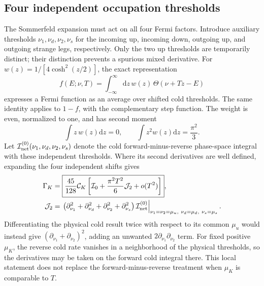 \documentclass[11pt,letterpaper]{article}
\numberwithin{equation}{section}
\newcommand{\dd}{\mathrm d}
\newcommand{\CK}{\mathcal C_K}
\newcommand{\Izero}{\mathcal I_0}
\newcommand{\Jtwo}{\mathcal J_2}
\begin{document}
\subsection{Four independent occupation thresholds}
The Sommerfeld expansion must act on all four Fermi factors.
Introduce auxiliary thresholds \(\nu_1,\nu_d,\nu_2,\nu_s\) for the incoming up, incoming down, outgoing up, and outgoing strange legs, respectively.
Only the two up thresholds are temporarily distinct; their distinction prevents a spurious mixed derivative.
For \(w(z)=1/[4\cosh^2(z/2)]\), the exact representation
\begin{equation}
 f(E;\nu,T)=\int_{-\infty}^{\infty}\dd z\,
 w(z)\,\Theta(\nu+Tz-E)
 \label{eq:logistic-convolution}
\end{equation}
expresses a Fermi function as an average over shifted cold thresholds.
The same identity applies to \(1-f\), with the complementary step function.
The weight is even, normalized to one, and has second moment
\begin{equation}
 \int z\,w(z)\dd z=0,
 \qquad \int z^2w(z)\dd z=\frac{\pi^2}{3}.
 \label{eq:moments}
\end{equation}
Let \(\mathcal I_{\rm net}^{(0)}(\nu_1,\nu_d,\nu_2,\nu_s)\) denote the cold forward-minus-reverse phase-space integral with these independent thresholds.
Where its second derivatives are well defined, expanding the four independent shifts gives
\begin{align}
 \Gamma_K
 &=\boxed{\frac{45}{128}\CK
 \left[\Izero+\frac{\pi^2T^2}{6}\Jtwo+o(T^2)\right]},
 \label{eq:thermal-expansion}\\
 \Jtwo
 &=\left.
 \left(\partial_{\nu_1}^2+\partial_{\nu_d}^2+
       \partial_{\nu_2}^2+\partial_{\nu_s}^2\right)
 \mathcal I_{\rm net}^{(0)}
 \right|_{\nu_1=\nu_2=\mu_u,\ \nu_d=\mu_d,\ \nu_s=\mu_s}.
 \label{eq:independent-derivatives}
\end{align}
Differentiating the physical cold result twice with respect to its common \(\mu_u\) would instead give \((\partial_{\nu_1}+\partial_{\nu_2})^2\), adding an unwanted \(2\partial_{\nu_1}\partial_{\nu_2}\) term.
For fixed positive \(\mu_K\), the reverse cold rate vanishes in a neighborhood of the physical thresholds, so the derivatives may be taken on the forward cold integral there.
This local statement does not replace the forward-minus-reverse treatment when \(\mu_K\) is comparable to \(T\).

\end{document}
